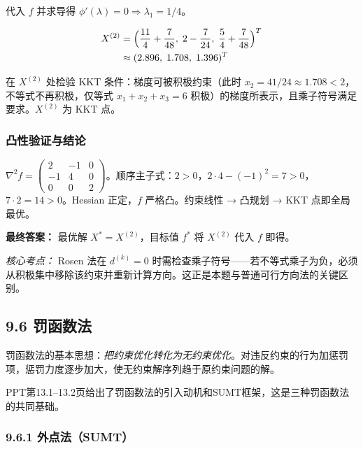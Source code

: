 {代入 $f$ 并求导得 $\phi'(\lambda)=0 \Rightarrow \lambda_1 = 1/4$。

\[
\begin{aligned}
X^{(2)} &= \Bigl(\frac{11}{4}+\frac{7}{48},\; 2-\frac{7}{24},\; \frac{5}{4}+\frac{7}{48}\Bigr)^T \\
&\approx (2.896,\; 1.708,\; 1.396)^T
\end{aligned}
\]

在 $X^{(2)}$ 处检验 KKT 条件：梯度可被积极约束（此时 $x_2 = 41/24 \approx 1.708 < 2$，不等式不再积极，仅等式 $x_1+x_2+x_3=6$ 积极）的梯度所表示，且乘子符号满足要求。$X^{(2)}$ 为 KKT 点。

\subsubsection{凸性验证与结论}

$\nabla^2 f = \begin{pmatrix} 2 & -1 & 0 \\ -1 & 4 & 0 \\ 0 & 0 & 2 \end{pmatrix}$。顺序主子式：$2>0$，$2\cdot 4-(-1)^2=7>0$，$7\cdot 2=14>0$。Hessian 正定，$f$ 严格凸。约束线性 → 凸规划 → KKT 点即全局最优。

\textbf{最终答案：} 最优解 $X^* = X^{(2)}$，目标值 $f^*$ 将 $X^{(2)}$ 代入 $f$ 即得。

\emph{核心考点：} Rosen 法在 $d^{(k)}=0$ 时需检查乘子符号——若不等式乘子为负，必须从积极集中移除该约束并重新计算方向。这正是本题与普通可行方向法的关键区别。

\medskip
{}
\medskip
{}
\medskip
}

\subsection{9.6 罚函数法}

罚函数法的基本思想：\emph{把约束优化转化为无约束优化}。对违反约束的行为加惩罚项，惩罚力度逐步加大，使无约束解序列趋于原约束问题的解。

PPT第13.1--13.2页给出了罚函数法的引入动机和SUMT框架，这是三种罚函数法的共同基础。

\medskip
{}
\medskip
{}
\medskip

\subsubsection{9.6.1 外点法（SUMT）}

